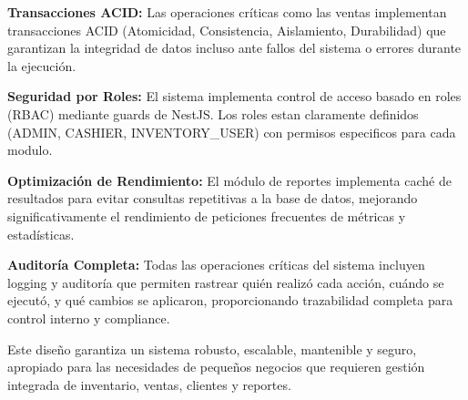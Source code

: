\textbf{Transacciones ACID:} Las operaciones críticas como las ventas implementan transacciones ACID (Atomicidad, Consistencia, Aislamiento, Durabilidad) que garantizan la integridad de datos incluso ante fallos del sistema o errores durante la ejecución.

\textbf{Seguridad por Roles:} El sistema implementa control de acceso basado en roles (RBAC) mediante guards de NestJS. Los roles estan claramente definidos (ADMIN, CASHIER, INVENTORY\_USER) con permisos especificos para cada modulo.

\textbf{Optimización de Rendimiento:} El módulo de reportes implementa caché de resultados para evitar consultas repetitivas a la base de datos, mejorando significativamente el rendimiento de peticiones frecuentes de métricas y estadísticas.

\textbf{Auditoría Completa:} Todas las operaciones críticas del sistema incluyen logging y auditoría que permiten rastrear quién realizó cada acción, cuándo se ejecutó, y qué cambios se aplicaron, proporcionando trazabilidad completa para control interno y compliance.

Este diseño garantiza un sistema robusto, escalable, mantenible y seguro, apropiado para las necesidades de pequeños negocios que requieren gestión integrada de inventario, ventas, clientes y reportes.
